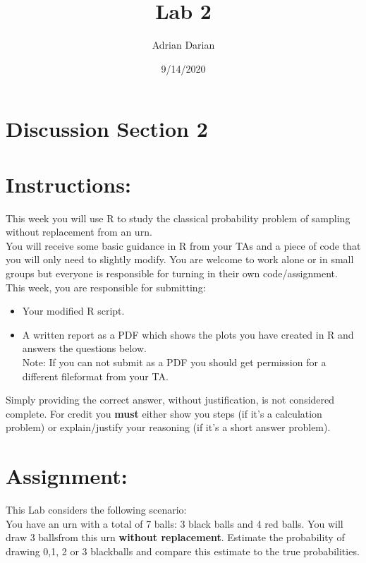 \documentclass[a4paper]{article}
\title{Lab 2}
\author{Adrian Darian}
\date{9/14/2020}
\begin{document}
  
\maketitle
  
\section*{Discussion Section 2}

\section*{Instructions:}
This week you will use R to study the classical probability problem of sampling without replacement from an urn. \\

You will receive some basic guidance in R from your TAs and a piece of code that you will only need to slightly modify.  You are welcome to work alone or in small groups but everyone is responsible for turning in their own code/assignment. \\

This week, you are responsible for submitting: \\

\begin{itemize}
    \item Your modified R script.
    \item A written report as a PDF which shows the plots you have created in R and answers the questions below. \\
    Note:  If you can not submit as a PDF you should get permission for a different fileformat from your TA. \\
\end{itemize}

Simply providing the correct answer, without justification, is not considered complete. For credit you \textbf{must} either show you steps (if it’s a calculation problem) or explain/justify your reasoning (if it’s a short answer problem).

\section*{Assignment:}
This Lab considers the following scenario: \\

You have an urn with a total of 7 balls: 3 black balls and 4 red balls. You will draw 3 ballsfrom this urn \textbf{without replacement}. Estimate the probability of drawing 0,1, 2 or 3 blackballs and compare this estimate to the true probabilities.
\end{document}
